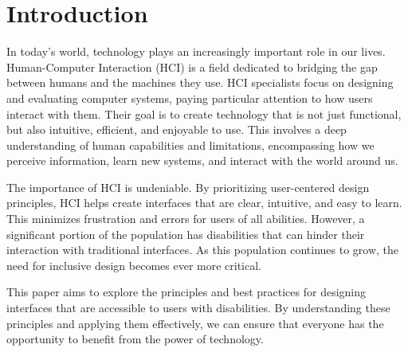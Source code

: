 \section{Introduction}

In today's world, technology plays an increasingly important role in our lives.
Human-Computer Interaction (HCI) is a field dedicated to bridging the gap
between humans and the machines they use. HCI specialists focus on designing and
evaluating computer systems, paying particular attention to how users interact
with them. Their goal is to create technology that is not just functional, but
also intuitive, efficient, and enjoyable to use. This involves a deep
understanding of human capabilities and limitations, encompassing how we
perceive information, learn new systems, and interact with the world around us.

The importance of HCI is undeniable. By prioritizing user-centered design
principles, HCI helps create interfaces that are clear, intuitive, and easy to
learn. This minimizes frustration and errors for users of all abilities.
However, a significant portion of the population has disabilities that can
hinder their interaction with traditional interfaces. As this population
continues to grow, the need for inclusive design becomes ever more critical.

This paper aims to explore the principles and best practices for designing
interfaces that are accessible to users with disabilities. By understanding
these principles and applying them effectively, we can ensure that everyone has
the opportunity to benefit from the power of technology.
